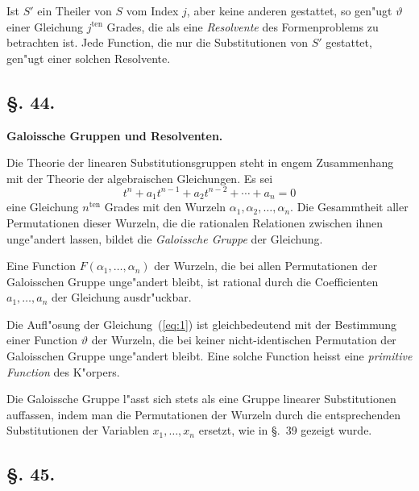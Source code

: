 \documentclass[12pt,a4paper]{article}
\theoremstyle{weber}
\begin{document}
Ist $S'$ ein Theiler von $S$ vom Index $j$, aber keine anderen gestattet, so gen"ugt $\vartheta$ einer Gleichung $j^{\text{ten}}$ Grades, die als eine \textit{Resolvente} des Formenproblems zu betrachten ist. Jede Function, die nur die Substitutionen von $S'$ gestattet, gen"ugt einer solchen Resolvente.

\newpage
\subsection*{\S. 44.}

\begin{center}
\textbf{Galoissche Gruppen und Resolventen.}
\end{center}

\bigskip

Die Theorie der linearen Substitutionsgruppen steht in engem Zusammenhang mit der Theorie der algebraischen Gleichungen. Es sei
\begin{equation}\label{eq:1}
t^n + a_1 t^{n-1} + a_2 t^{n-2} + \cdots + a_n = 0
\end{equation}
eine Gleichung $n^{\text{ten}}$ Grades mit den Wurzeln $\alpha_1, \alpha_2, \ldots, \alpha_n$. Die Gesammtheit aller Permutationen dieser Wurzeln, die die rationalen Relationen zwischen ihnen unge"andert lassen, bildet die \textit{Galoissche Gruppe} der Gleichung.

Eine Function $F(\alpha_1, \ldots, \alpha_n)$ der Wurzeln, die bei allen Permutationen der Galoisschen Gruppe unge"andert bleibt, ist rational durch die Coefficienten $a_1, \ldots, a_n$ der Gleichung ausdr"uckbar.

Die Aufl"osung der Gleichung~(\ref{eq:1}) ist gleichbedeutend mit der Bestimmung einer Function $\vartheta$ der Wurzeln, die bei keiner nicht-identischen Permutation der Galoisschen Gruppe unge"andert bleibt. Eine solche Function heisst eine \textit{primitive Function} des K"orpers.

Die Galoissche Gruppe l"asst sich stets als eine Gruppe linearer Substitutionen auffassen, indem man die Permutationen der Wurzeln durch die entsprechenden Substitutionen der Variablen $x_1, \ldots, x_n$ ersetzt, wie in \S.~39 gezeigt wurde.

\newpage
\subsection*{\S. 45.}
\end{document}
